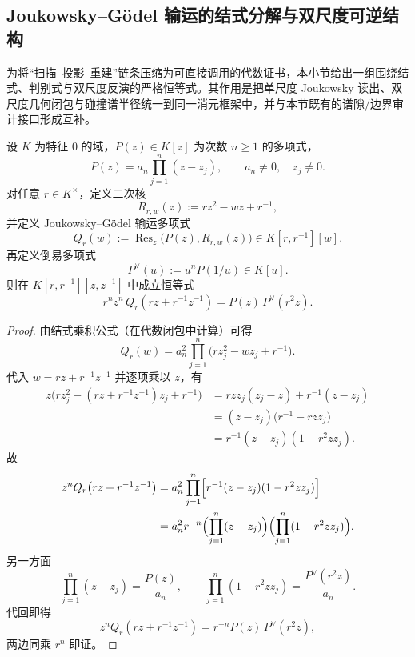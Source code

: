 \subsection{Joukowsky--Gödel 输运的结式分解与双尺度可逆结构}\label{subsec:group-unification-joukowsky-godel}

为将“扫描--投影--重建”链条压缩为可直接调用的代数证书，本小节给出一组围绕结式、判别式与双尺度反演的严格恒等式。其作用是把单尺度 Joukowsky 读出、双尺度几何闭包与碰撞谱半径统一到同一消元框架中，并与本节既有的谱隙/边界审计接口形成互补。

\begin{theorem}\label{thm:group-jg-pullback-factorization}
设 \(K\) 为特征 \(0\) 的域，\(P(z)\in K[z]\) 为次数 \(n\ge 1\) 的多项式，
\[
P(z)=a_n\prod_{j=1}^{n}(z-z_j),\qquad a_n\neq 0,\quad z_j\neq 0.
\]
对任意 \(r\in K^\times\)，定义二次核
\[
R_{r,w}(z):=r z^2-w z+r^{-1},
\]
并定义 Joukowsky--Gödel 输运多项式
\[
Q_r(w):=\operatorname{Res}_{z}\!\bigl(P(z),R_{r,w}(z)\bigr)\in K[r,r^{-1}][w].
\]
再定义倒易多项式
\[
P^{\vee}(u):=u^n P(1/u)\in K[u].
\]
则在 \(K[r,r^{-1}][z,z^{-1}]\) 中成立恒等式
\[
\boxed{\;
r^n z^n\,Q_r\!\left(r z+r^{-1}z^{-1}\right)=P(z)\,P^{\vee}(r^2 z).
\;}
\]
\end{theorem}
\begin{proof}
由结式乘积公式（在代数闭包中计算）可得
\[
Q_r(w)=a_n^2\prod_{j=1}^{n}\bigl(r z_j^2-w z_j+r^{-1}\bigr).
\]
代入 \(w=r z+r^{-1}z^{-1}\) 并逐项乘以 \(z\)，有
\[
\begin{aligned}
z\bigl(r z_j^2-(r z+r^{-1}z^{-1})z_j+r^{-1}\bigr)
&=r z z_j(z_j-z)+r^{-1}(z-z_j)\\
&=(z-z_j)\bigl(r^{-1}-r z z_j\bigr)\\
&=r^{-1}(z-z_j)(1-r^2 z z_j).
\end{aligned}
\]
故
\[
\begin{aligned}
z^n Q_r\!\left(r z+r^{-1}z^{-1}\right)
&=a_n^2\prod_{j=1}^{n}\Bigl[r^{-1}(z-z_j)(1-r^2 z z_j)\Bigr]\\
&=a_n^2 r^{-n}\Bigl(\prod_{j=1}^{n}(z-z_j)\Bigr)\Bigl(\prod_{j=1}^{n}(1-r^2 z z_j)\Bigr).
\end{aligned}
\]
另一方面
\[
\prod_{j=1}^{n}(z-z_j)=\frac{P(z)}{a_n},\qquad
\prod_{j=1}^{n}(1-r^2 z z_j)=\frac{P^{\vee}(r^2 z)}{a_n}.
\]
代回即得
\[
z^n Q_r\!\left(r z+r^{-1}z^{-1}\right)=r^{-n}P(z)\,P^{\vee}(r^2 z),
\]
两边同乘 \(r^n\) 即证。
\end{proof}



